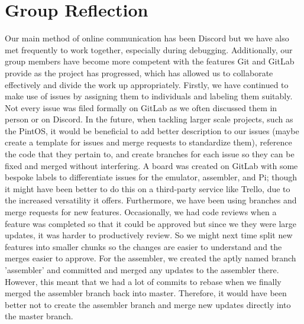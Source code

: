 \documentclass[11pt]{article}
\begin{document}
\section{Group Reflection}
Our main method of online communication has been Discord but we have also met frequently to work together, especially during debugging. Additionally, our group members have become more competent with the features Git and GitLab provide as the project has progressed, which has allowed us to collaborate effectively and divide the work up appropriately. Firstly, we have continued to make use of issues by assigning them to individuals and labeling them suitably. Not every issue was filed formally on GitLab as we often discussed them in person or on Discord. In the future, when tackling larger scale projects, such as the PintOS, it would be beneficial to add better description to our issues (maybe create a template for issues and merge requests to standardize them), reference the code that they pertain to, and create branches for each issue so they can be fixed and merged without interfering. A board was created on GitLab with some bespoke labels to differentiate issues for the emulator, assembler, and Pi; though it might have been better to do this on a third-party service like Trello, due to the increased versatility it offers. Furthermore, we have been using branches and merge requests for new features. Occasionally, we had code reviews when a feature was completed so that it could be approved but since we they were large updates, it was harder to productively review. So we might next time split new features into smaller chunks so the changes are easier to understand and the merges easier to approve. For the assembler, we created the aptly named branch 'assembler' and committed and merged any updates to the assembler there. However, this meant that we had a lot of commits to rebase when we finally merged the assembler branch back into master. Therefore, it would have been better not to create the assembler branch and merge new updates directly into the master branch. \\\\
\end{document}
